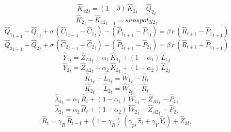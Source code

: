 \begin{dmath}
{{\hat{K}_{x2}}}_{t}=\left(1-{{\delta}}\right)\, {{\hat{K}_{2}}}_{t}-{{\hat{Q}_{2}}}_{t}
\end{dmath}
\begin{dmath}
{{\hat{K}_{2}}}_{t}-{{\hat{K}_{x2}}}_{t-1}={{sunspot_{K2}}}_{t}
\end{dmath}
\begin{dmath}
{{\hat{Q}_{1}}}_{t+1}-{{\hat{Q}_{1}}}_{t}+{{\sigma}}\, \left({{\hat{C}_{1}}}_{t+1}-{{\hat{C}_{1}}}_{t}\right)-\left({{\hat{P}_{1}}}_{t+1}-{{\hat{P}_{1}}}_{t}\right)={{\beta}}\, {r}\, \left({{\hat{R}}}_{t+1}-{{\hat{P}_{1}}}_{t+1}\right)
\end{dmath}
\begin{dmath}
{{\hat{Q}_{2}}}_{t+1}-{{\hat{Q}_{2}}}_{t}+{{\sigma}}\, \left({{\hat{C}_{2}}}_{t+1}-{{\hat{C}_{2}}}_{t}\right)-\left({{\hat{P}_{2}}}_{t+1}-{{\hat{P}_{2}}}_{t}\right)={{\beta}}\, {r}\, \left({{\hat{R}}}_{t+1}-{{\hat{P}_{1}}}_{t+1}\right)
\end{dmath}
\begin{dmath}
{{\hat{Y}_{1}}}_{t}={{\hat{Z}_{A1}}}_{t}+{{\alpha_{1}}}\, {{\hat{K}_{1}}}_{t}+\left(1-{{\alpha_{1}}}\right)\, {{\hat{L}_{1}}}_{t}
\end{dmath}
\begin{dmath}
{{\hat{Y}_{2}}}_{t}={{\hat{Z}_{A2}}}_{t}+{{\alpha_{2}}}\, {{\hat{K}_{2}}}_{t}+\left(1-{{\alpha_{2}}}\right)\, {{\hat{L}_{2}}}_{t}
\end{dmath}
\begin{dmath}
{{\hat{K}_{1}}}_{t}-{{\hat{L}_{1}}}_{t}={{\hat{W}_{1}}}_{t}-{{\hat{R}}}_{t}
\end{dmath}
\begin{dmath}
{{\hat{K}_{2}}}_{t}-{{\hat{L}_{2}}}_{t}={{\hat{W}_{2}}}_{t}-{{\hat{R}}}_{t}
\end{dmath}
\begin{dmath}
{{\hat{\lambda}_{1}}}_{t}={{\alpha_{1}}}\, {{\hat{R}}}_{t}+\left(1-{{\alpha_{1}}}\right)\, {{\hat{W}_{1}}}_{t}-{{\hat{Z}_{A1}}}_{t}-{{\hat{P}_{1}}}_{t}
\end{dmath}
\begin{dmath}
{{\hat{\lambda}_{2}}}_{t}={{\alpha_{2}}}\, {{\hat{R}}}_{t}+\left(1-{{\alpha_{2}}}\right)\, {{\hat{W}_{2}}}_{t}-{{\hat{Z}_{A2}}}_{t}-{{\hat{P}_{2}}}_{t}
\end{dmath}
\begin{dmath}
{{\hat{R}}}_{t}={{\gamma_{R}}}\, {{\hat{R}}}_{t-1}+\left(1-{{\gamma_{R}}}\right)\, \left({{\gamma_{pi}}}\, {{\hat{\pi}}}_{t}+{{\gamma_{Y}}}\, {{\hat{Y}}}_{t}\right)+{{\hat{Z}_M}}_{t}
\end{dmath}
